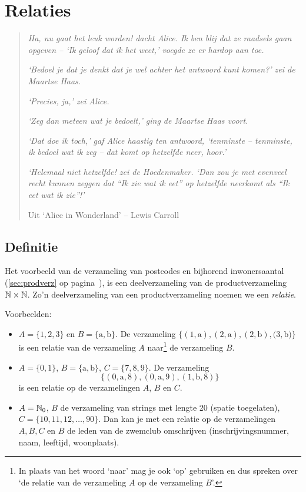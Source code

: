 %
 
 
\chapter{Relaties}
\label{chap:relatie}
\begin{quote}
\textit{Ha, nu gaat het leuk worden! dacht Alice. Ik ben blij dat ze raadsels gaan opgeven -- `Ik geloof dat ik het weet,' voegde ze er hardop aan toe.}

\textit{`Bedoel je dat je denkt dat je wel achter het antwoord kunt komen?' zei de Maartse Haas.}

\textit{`Precies, ja,' zei Alice.}

\textit{`Zeg dan meteen wat je bedoelt,' ging de Maartse Haas voort.}

\textit{`Dat doe ik toch,' gaf Alice haastig ten antwoord, `tenminste -- tenminste, ik bedoel wat ik zeg -- dat komt op hetzelfde neer, hoor.'}

\textit{`Helemaal niet hetzelfde! zei de Hoedenmaker. `Dan zou je met evenveel recht kunnen zeggen dat ``Ik zie wat ik eet'' op hetzelfde neerkomt als ``Ik eet wat ik zie''!'}

          Uit `Alice in Wonderland' -- Lewis Carroll
\end{quote}



\newpage
\section{Definitie}
\label{sec:defRelatie}
Het voorbeeld van de verzameling van postcodes en bijhorend inwonersaantal (\cref{sec:prodverz} op pagina~\pageref{pg:postcodes}), is een deelverzameling van de productverzameling  $\mathbb{N}\times\mathbb{N}$. Zo'n deelverzameling van een productverzameling noemen we een \emph{relatie}.

Voorbeelden:
\begin{itemize}
  \item $A=\{1,2,3\}$ en $B=\{\text{a}, \text{b}\}$. De verzameling $\{(1, \text{a}), (2,\text{a}),(2,\text{b}),(3,\text{b)}\}$
        is een relatie van de verzameling $A$ naar\footnote{In plaats van het woord `naar' mag je ook `op' gebruiken en dus spreken over `de relatie van de verzameling $A$ op de verzameling $B$'.} de verzameling $B$.
  \item $A=\{0,1\}$, $B=\{\mathrm{a},\mathrm{b}\}$, $C=\{7,8,9\}$. De verzameling
        \[ \{(0,\mathrm{a},8), (0,\mathrm{a},9), (1,\mathrm{b},8) \} \]
        is een relatie op de verzamelingen $A$, $B$ en $C$.
  \item $A=\mathbb{N}_0$, $B$ de verzameling van strings met lengte 20 (spatie toegelaten),
       $C=\{10,11,12,\dots,90\}$. Dan kan je met een relatie op de verzamelingen $A, B, C$ en $B$ de leden van de zwemclub omschrijven (inschrijvingsnummer, naam, leeftijd, woonplaats).
\end{itemize}

